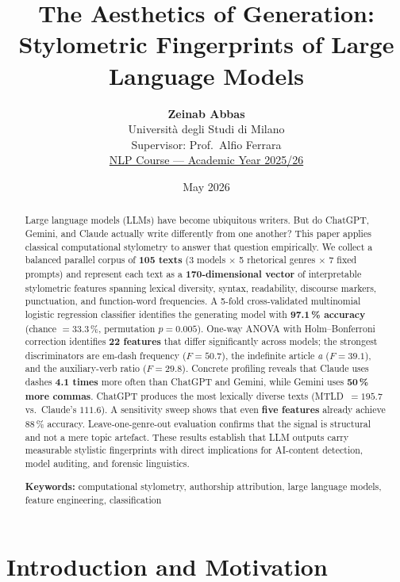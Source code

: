 \documentclass[11pt,a4paper]{article}
\title{%
  \vspace{-1cm}
  \textbf{\Large The Aesthetics of Generation:}\\[2pt]
  {\large Stylometric Fingerprints of Large Language Models}
}
\author{%
  \textbf{Zeinab Abbas}\\[2pt]
  \small Università degli Studi di Milano\\
  \small Supervisor: Prof.\ Alfio Ferrara\\
  \small \href{mailto:}{NLP Course --- Academic Year 2025/26}
}
\date{\small May 2026}
\begin{document}
\maketitle
\thispagestyle{fancy}

\begin{abstract}
Large language models (LLMs) have become ubiquitous writers. But do
ChatGPT, Gemini, and Claude actually write differently from one
another? This paper applies classical computational stylometry to
answer that question empirically. We collect a balanced parallel
corpus of \textbf{105 texts} (3 models $\times$ 5 rhetorical genres
$\times$ 7 fixed prompts) and represent each text as a
\textbf{170-dimensional vector} of interpretable stylometric features
spanning lexical diversity, syntax, readability, discourse markers,
punctuation, and function-word frequencies. A 5-fold cross-validated
multinomial logistic regression classifier identifies the generating
model with \textbf{97.1\,\% accuracy} (chance $= 33.3$\,\%,
permutation $p = 0.005$). One-way ANOVA with Holm--Bonferroni
correction identifies \textbf{22 features} that differ significantly
across models; the strongest discriminators are em-dash frequency
($F = 50.7$), the indefinite article \textit{a} ($F = 39.1$), and
the auxiliary-verb ratio ($F = 29.8$). Concrete profiling reveals that
Claude uses dashes \textbf{4.1 times} more often than ChatGPT and
Gemini, while Gemini uses \textbf{50\,\% more commas}. ChatGPT
produces the most lexically diverse texts (MTLD~$=195.7$ vs.\ Claude's
$111.6$). A sensitivity sweep shows that even \textbf{five features}
already achieve 88\,\% accuracy. Leave-one-genre-out evaluation
confirms that the signal is structural and not a mere topic artefact.
These results establish that LLM outputs carry measurable stylistic
fingerprints with direct implications for AI-content detection, model
auditing, and forensic linguistics.

\medskip\noindent
\textbf{Keywords:} computational stylometry, authorship attribution,
large language models, feature engineering, classification
\end{abstract}

\newpage

\section{Introduction and Motivation}
\label{sec:intro}
\end{document}
